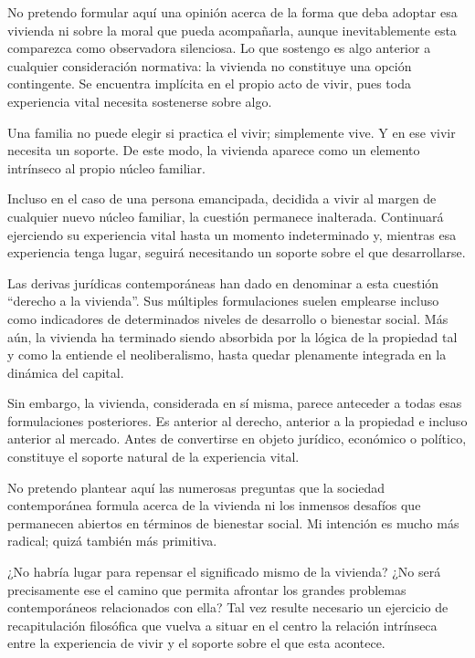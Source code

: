 \documentclass[12pt,a4paper]{article}
\begin{document}
No pretendo formular aquí una opinión acerca de la forma que deba adoptar esa vivienda ni sobre la moral que pueda acompañarla, aunque inevitablemente esta comparezca como observadora silenciosa. Lo que sostengo es algo anterior a cualquier consideración normativa: la vivienda no constituye una opción contingente. Se encuentra implícita en el propio acto de vivir, pues toda experiencia vital necesita sostenerse sobre algo.

Una familia no puede elegir si practica el vivir; simplemente vive. Y en ese vivir necesita un soporte. De este modo, la vivienda aparece como un elemento intrínseco al propio núcleo familiar.

Incluso en el caso de una persona emancipada, decidida a vivir al margen de cualquier nuevo núcleo familiar, la cuestión permanece inalterada. Continuará ejerciendo su experiencia vital hasta un momento indeterminado y, mientras esa experiencia tenga lugar, seguirá necesitando un soporte sobre el que desarrollarse.

Las derivas jurídicas contemporáneas han dado en denominar a esta cuestión ``derecho a la vivienda''. Sus múltiples formulaciones suelen emplearse incluso como indicadores de determinados niveles de desarrollo o bienestar social. Más aún, la vivienda ha terminado siendo absorbida por la lógica de la propiedad tal y como la entiende el neoliberalismo, hasta quedar plenamente integrada en la dinámica del capital.

Sin embargo, la vivienda, considerada en sí misma, parece anteceder a todas esas formulaciones posteriores. Es anterior al derecho, anterior a la propiedad e incluso anterior al mercado. Antes de convertirse en objeto jurídico, económico o político, constituye el soporte natural de la experiencia vital.

No pretendo plantear aquí las numerosas preguntas que la sociedad contemporánea formula acerca de la vivienda ni los inmensos desafíos que permanecen abiertos en términos de bienestar social. Mi intención es mucho más radical; quizá también más primitiva.

¿No habría lugar para repensar el significado mismo de la vivienda? ¿No será precisamente ese el camino que permita afrontar los grandes problemas contemporáneos relacionados con ella? Tal vez resulte necesario un ejercicio de recapitulación filosófica que vuelva a situar en el centro la relación intrínseca entre la experiencia de vivir y el soporte sobre el que esta acontece.
\end{document}
